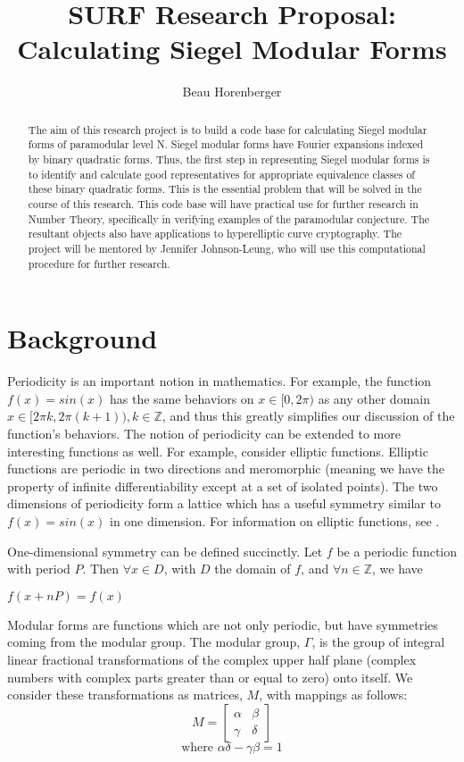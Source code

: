 \documentclass[11pt, oneside]{amsart}
\title{SURF Research Proposal:\\ Calculating Siegel Modular Forms}
\author{Beau Horenberger}
\begin{document}
\maketitle
\begin{abstract}

The aim of this research project is to build a code base for calculating Siegel modular forms of paramodular level N. Siegel modular forms have Fourier expansions indexed by binary quadratic forms. Thus, the first step in representing Siegel modular forms is to identify and calculate good representatives for appropriate equivalence classes of these binary quadratic forms. This is the essential problem that will be solved in the course of this research. This code base will have practical use for further research in Number Theory, specifically in verifying examples of the paramodular conjecture. The resultant objects also have applications to hyperelliptic curve cryptography. The project will be mentored by Jennifer Johnson-Leung, who will use this computational procedure for further research. 

\end{abstract}

\section{Background}

Periodicity is an important notion in mathematics. For example, the function $f(x)=sin(x)$ has the same behaviors on $x\in[0,2\pi )$ as any other domain $x\in[2\pi k,2\pi (k+1) ),k\in\mathbb{Z}$, and thus this greatly simplifies our discussion of the function's behaviors. The notion of periodicity can be extended to more interesting functions as well. For example, consider elliptic functions. Elliptic functions are periodic in two directions and meromorphic (meaning we have the property of infinite differentiability except at a set of isolated points). The two dimensions of periodicity form a lattice which has a useful symmetry similar to $f(x)=sin(x)$ in one dimension. For information on elliptic functions, see \cite{Armitage}.

One-dimensional symmetry can be defined succinctly. Let $f$ be a periodic function with period $P$. Then $\forall x\in D$, with $D$ the domain of $f$, and $\forall n\in \mathbb{Z}$, we have

$f(x+nP)=f(x)$

Modular forms are functions which are not only periodic, but have symmetries coming from the modular group. The modular group, $\Gamma$, is the group of integral linear fractional transformations of the complex upper half plane (complex numbers with complex parts greater than or equal to zero) onto itself. We consider these transformations as matrices, $M$, with mappings as follows:
\[
M=
\begin{bmatrix}

\alpha &	\beta \\
\gamma & \delta

\end{bmatrix}
\]
$$\text{where }\alpha\delta-\gamma\beta=1$$
\end{document}

